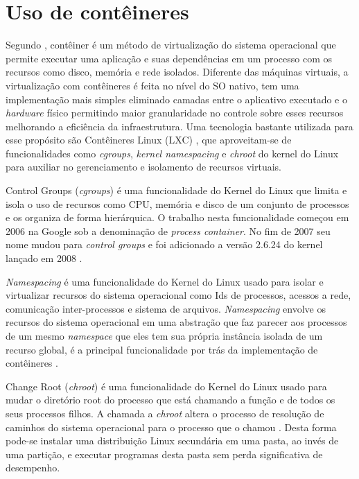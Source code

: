 \section{Uso de contêineres}
\label{sec:conteiner}

Segundo \cite{AmazonContainer}, contêiner é um método de virtualização do sistema operacional que permite executar uma aplicação e suas dependências em um processo com os recursos como disco, memória e rede isolados.
%
Diferente das máquinas virtuais, a virtualização com contêineres é feita no nível do SO nativo, tem uma implementação mais simples eliminado camadas entre o aplicativo executado e o \textit{hardware} físico permitindo maior granularidade no controle sobre esses recursos melhorando a eficiência da infraestrutura.
%
Uma tecnologia bastante utilizada para esse propósito são Contêineres Linux (LXC) \cite{Linuxcontainers.org2015}, que aproveitam-se de funcionalidades como \textit{cgroups}, \textit{kernel namespacing} e \textit{chroot} do kernel do Linux para auxiliar no gerenciamento e isolamento de recursos virtuais.

Control Groups (\textit{cgroups}) é uma funcionalidade do Kernel do Linux que limita e isola o uso de recursos como CPU, memória e disco de um conjunto de processos e os organiza de forma hierárquica. 
%
O trabalho nesta funcionalidade começou em 2006 na Google sob a denominação de \textit{process container}. No fim de 2007 seu nome mudou para \textit{control groups} e foi adicionado a versão 2.6.24 do kernel lançado em 2008 \cite{UnixManPagesControlGroups}.

\textit{Namespacing} é uma funcionalidade do Kernel do Linux usado para isolar e virtualizar recursos do sistema operacional como Ids de processos, acessos a rede, comunicação inter-processos e sistema de arquivos.
%
\textit{Namespacing} envolve os recursos do sistema operacional em uma abstração que faz parecer aos processos de um mesmo \textit{namespace} que eles tem sua própria instância isolada de um recurso global, é a principal funcionalidade por trás da implementação de contêineres \cite{UnixManPagesNamespacing}.

Change Root (\textit{chroot}) é uma funcionalidade do Kernel do Linux usado para mudar o diretório root do processo que está chamando a função e de todos os seus processos filhos. 
%
A chamada a \textit{chroot} altera o processo de resolução de caminhos do sistema operacional para o processo que o chamou \cite{UnixManPagesChRoot}.
%
Desta forma pode-se instalar uma distribuição Linux secundária em uma pasta, ao invés de uma partição, e executar programas desta pasta sem perda significativa de desempenho.

